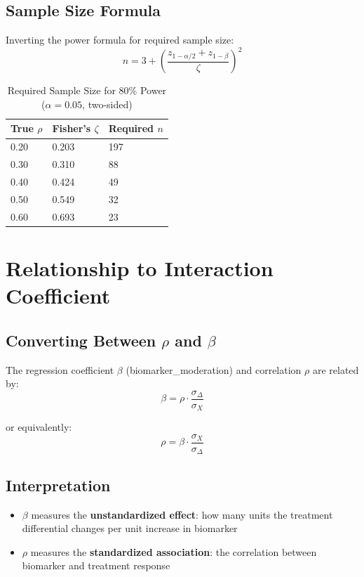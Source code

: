 \documentclass[11pt]{article}
\theoremstyle{definition}
\begin{document}
\subsection{Sample Size Formula}

Inverting the power formula for required sample size:
\begin{equation}
\boxed{n = 3 + \left(\frac{z_{1-\alpha/2} + z_{1-\beta}}{\zeta}\right)^2}
\end{equation}

\begin{table}[h]
\centering
\caption{Required Sample Size for 80\% Power ($\alpha = 0.05$, two-sided)}
\begin{tabular}{@{}lll@{}}
\toprule
\textbf{True $\rho$} & \textbf{Fisher's $\zeta$} & \textbf{Required $n$} \\
\midrule
0.20 & 0.203 & 197 \\
0.30 & 0.310 & 88 \\
0.40 & 0.424 & 49 \\
0.50 & 0.549 & 32 \\
0.60 & 0.693 & 23 \\
\bottomrule
\end{tabular}
\end{table}

\section{Relationship to Interaction Coefficient}

\subsection{Converting Between $\rho$ and $\beta$}

The regression coefficient $\beta$ (biomarker\_moderation) and correlation
$\rho$ are related by:
\begin{equation}
\beta = \rho \cdot \frac{\sigma_{\Delta}}{\sigma_X}
\end{equation}

or equivalently:
\begin{equation}
\rho = \beta \cdot \frac{\sigma_X}{\sigma_{\Delta}}
\end{equation}

\subsection{Interpretation}

\begin{itemize}
    \item $\beta$ measures the \textbf{unstandardized effect}: how many units
    the treatment differential changes per unit increase in biomarker
    \item $\rho$ measures the \textbf{standardized association}: the
    correlation between biomarker and treatment response
\end{itemize}
\end{document}
